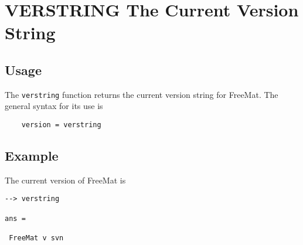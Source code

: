 \section{VERSTRING The Current Version String}

\subsection{Usage}

The \verb|verstring| function returns the current version string for
FreeMat.  The general syntax for its use is
\begin{verbatim}
    version = verstring
\end{verbatim}
\subsection{Example}

The current version of FreeMat is
\begin{verbatim}
--> verstring

ans = 

 FreeMat v svn
\end{verbatim}

